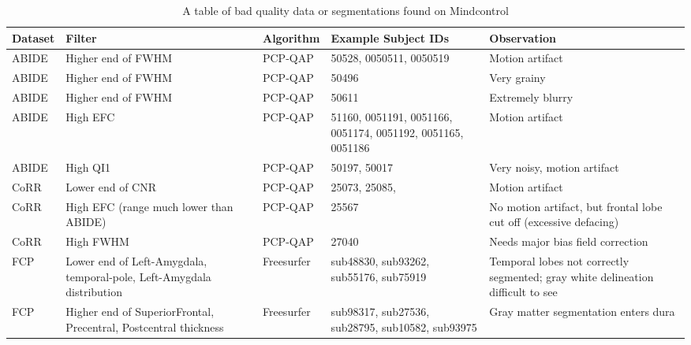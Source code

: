

\begin{table}
\begin{tabular}{ | l | p{3cm} | l | p{3cm} | p{4cm} | }

\hline
	\textbf{Dataset} & \textbf{Filter} & \textbf{Algorithm} & \textbf{Example Subject IDs} & \textbf{Observation} \\ \hline
	ABIDE & Higher end of FWHM & PCP-QAP & 50528, 0050511, 0050519 & Motion artifact \\ \hline
	ABIDE & Higher end of FWHM & PCP-QAP & 50496 & Very grainy \\ \hline
	ABIDE & Higher end of FWHM & PCP-QAP & 50611 & Extremely blurry \\ \hline
	ABIDE & High EFC & PCP-QAP & 51160, 0051191, 0051166, 0051174, 0051192, 0051165, 0051186 & Motion artifact \\ \hline
	ABIDE & High QI1 & PCP-QAP & 50197, 50017 & Very noisy, motion artifact \\ \hline
	CoRR & Lower end of CNR & PCP-QAP & 25073, 25085, & Motion artifact \\ \hline
	CoRR & High EFC (range much lower than ABIDE) & PCP-QAP & 25567 & No motion artifact, but frontal lobe cut off (excessive defacing) \\ \hline
	CoRR & High FWHM & PCP-QAP & 27040 & Needs major bias field correction \\ \hline
	FCP & Lower end of Left-Amygdala, temporal-pole, Left-Amygdala distribution & Freesurfer & sub48830, sub93262, sub55176, sub75919 & Temporal lobes not correctly segmented; gray white delineation difficult to see \\ \hline
	FCP & Higher end of SuperiorFrontal, Precentral, Postcentral thickness & Freesurfer & sub98317, sub27536, sub28795, sub10582, sub93975 & Gray matter segmentation enters dura \\ \hline



\end{tabular}
\label{tab:examples}
\caption{A table of bad quality data or segmentations found on Mindcontrol}

\end{table}

